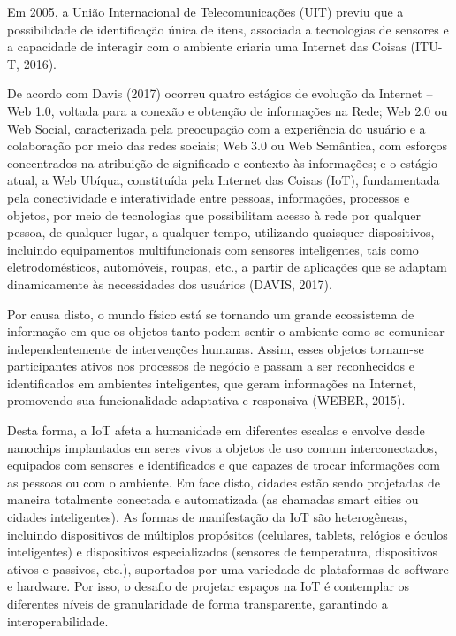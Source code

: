 \documentclass[eso]{bcc}
\begin{document}
Em 2005, a União Internacional de Telecomunicações (UIT) previu que a possibilidade de 
identificação única de itens, associada a tecnologias de sensores e a capacidade de interagir 
com o ambiente criaria uma Internet das Coisas (ITU-T, 2016). 

De acordo com Davis (2017) ocorreu quatro estágios de evolução da Internet – Web 1.0, voltada 
para a conexão e obtenção de informações na Rede; Web 2.0 ou Web Social, caracterizada pela 
preocupação com a experiência do usuário e a colaboração por meio das redes sociais; 
Web 3.0 ou Web Semântica, com esforços concentrados na atribuição de significado e contexto 
às informações; e o estágio atual, a Web Ubíqua, constituída pela Internet das Coisas (IoT), 
fundamentada pela conectividade e interatividade entre pessoas, informações, processos e objetos, 
por meio de tecnologias que possibilitam acesso à rede por qualquer pessoa, de qualquer lugar, 
a qualquer tempo, utilizando quaisquer dispositivos, incluindo equipamentos multifuncionais com 
sensores inteligentes, tais como eletrodomésticos, automóveis, roupas, etc., a partir de 
aplicações que se adaptam dinamicamente às necessidades dos usuários (DAVIS, 2017). 

Por causa disto, o mundo físico está se tornando um grande ecossistema de informação em que 
os objetos tanto podem sentir o ambiente como se comunicar independentemente de intervenções humanas. 
Assim, esses objetos tornam-se participantes ativos nos processos de negócio e passam a ser 
reconhecidos e identificados em ambientes inteligentes, que geram informações na Internet, 
promovendo sua funcionalidade adaptativa e responsiva (WEBER, 2015).

Desta forma, a IoT afeta a humanidade em diferentes escalas e envolve desde nanochips implantados 
em seres vivos a objetos de uso comum interconectados, equipados com sensores e identificados 
e que capazes de trocar informações com as pessoas ou com o ambiente. Em face disto, cidades 
estão sendo projetadas de maneira totalmente conectada e automatizada (as chamadas smart cities 
ou cidades inteligentes). As formas de manifestação da IoT são heterogêneas, incluindo dispositivos 
de múltiplos propósitos (celulares, tablets, relógios e óculos inteligentes) e dispositivos 
especializados (sensores de temperatura, dispositivos ativos e passivos, etc.), suportados por 
uma variedade de plataformas de software e hardware. Por isso, o desafio de projetar espaços na 
IoT é contemplar os diferentes níveis de granularidade de forma transparente, garantindo a 
interoperabilidade.
\end{document}
